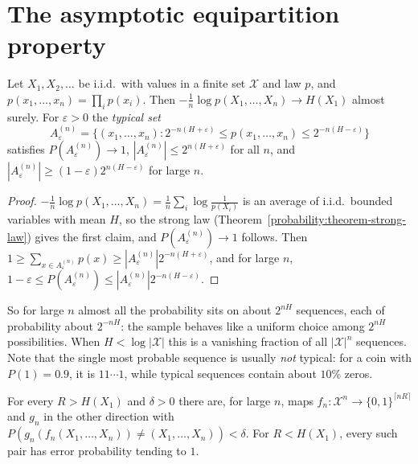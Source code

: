 \section{The asymptotic equipartition property}\label{information-theory:section-aep}

\begin{theorem}\label{information-theory:theorem-aep}
Let $X_1, X_2, \ldots$ be i.i.d.\ with values in a finite set $\mathcal{X}$ and law $p$, and $p(x_1, \ldots, x_n) = \prod_ip(x_i)$. Then $-\frac1n\log p(X_1, \ldots, X_n) \to H(X_1)$ almost surely. For $\varepsilon > 0$ the \emph{typical set}
\[
A_\varepsilon^{(n)} = \bigl\{(x_1, \ldots, x_n) : 2^{-n(H + \varepsilon)} \leq p(x_1, \ldots, x_n) \leq 2^{-n(H - \varepsilon)}\bigr\}
\]
satisfies $P(A_\varepsilon^{(n)}) \to 1$, $|A_\varepsilon^{(n)}| \leq 2^{n(H + \varepsilon)}$ for all $n$, and $|A_\varepsilon^{(n)}| \geq (1 - \varepsilon)2^{n(H - \varepsilon)}$ for large $n$.
\end{theorem}

\begin{proof}
$-\frac1n\log p(X_1, \ldots, X_n) = \frac1n\sum_i\log\frac{1}{p(X_i)}$ is an average of i.i.d.\ bounded variables with mean $H$, so the strong law (Theorem~\ref{probability:theorem-strong-law}) gives the first claim, and
$P(A_\varepsilon^{(n)}) \to 1$ follows. Then $1 \geq \sum_{x \in A_\varepsilon^{(n)}}p(x) \geq |A_\varepsilon^{(n)}|2^{-n(H + \varepsilon)}$, and for large $n$, $1 - \varepsilon \leq P(A_\varepsilon^{(n)}) \leq |A_\varepsilon^{(n)}|2^{-n(H - \varepsilon)}$.
\end{proof}

So for large $n$ almost all the probability sits on about $2^{nH}$ sequences, each of probability about $2^{-nH}$: the sample behaves like a uniform choice among $2^{nH}$ possibilities. When $H < \log|\mathcal{X}|$ this is a
vanishing fraction of all $|\mathcal{X}|^n$ sequences. Note that the single most probable sequence is usually \emph{not} typical: for a coin with $P(1) = 0.9$, it is $11\cdots1$, while typical sequences contain about $10\%$ zeros.

\begin{corollary}\label{information-theory:corollary-fixed-length}
For every $R > H(X_1)$ and $\delta > 0$ there are, for large $n$, maps $f_n \colon \mathcal{X}^n \to \{0, 1\}^{\lceil nR\rceil}$ and $g_n$ in the other direction with $P(g_n(f_n(X_1, \ldots, X_n)) \neq (X_1, \ldots, X_n)) < \delta$. For
$R < H(X_1)$, every such pair has error probability tending to $1$.
\end{corollary}


